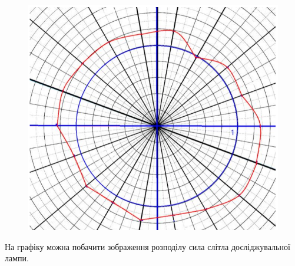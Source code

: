 \begin{figure}[ht]

\centering

\includegraphics[width=0.7\linewidth]{Pics/tabl3.png}

\label{table1}

\end{figure}

На графіку можна побачити зображення розподілу сила слітла досліджувальної лампи.
